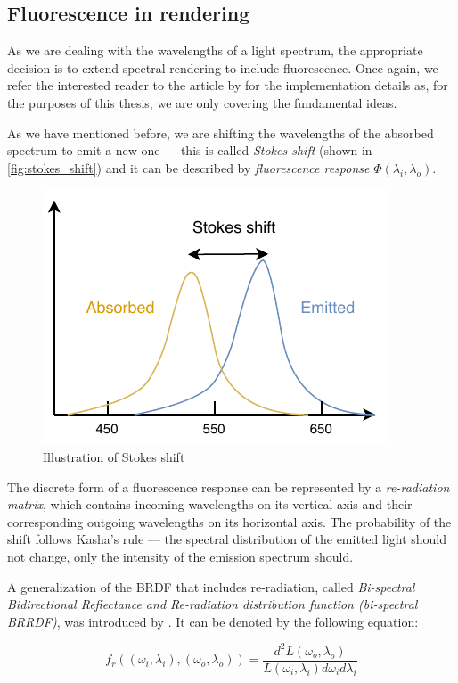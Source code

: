 \subsection{Fluorescence in rendering}
As we are dealing with the wavelengths of a light spectrum, the appropriate decision is to extend spectral rendering to include fluorescence. Once again, we refer the interested reader to the article by \citet{mojzik2018handling} for the implementation details as, for the purposes of this thesis, we are only covering the fundamental ideas.

As we have mentioned before, we are shifting the wavelengths of the absorbed spectrum to emit a new one --- this is called \emph{Stokes shift} (shown in \autoref{fig:stokes_shift}) and it can be described by \emph{fluorescence response} $\Phi(\lambda_i,\lambda_o)$.

\begin{figure}
	\centering
	\includegraphics[width=0.7\linewidth]{img/stokes_shift.pdf}
	\caption{Illustration of Stokes shift}
	\label{fig:stokes_shift}
\end{figure}

The discrete form of a fluorescence response can be represented by a \emph{re-radiation matrix}, which contains incoming wavelengths on its vertical axis and their corresponding outgoing wavelengths on its horizontal axis. The probability of the shift follows Kasha's rule --- the spectral distribution of the emitted light should not change, only the intensity of the emission spectrum should.

A generalization of the BRDF that includes re-radiation, called \emph{Bi-spectral Bidirectional Reflectance and Re-radiation distribution function (bi-spectral BRRDF)}, was introduced by \citet{hullin2010acquisition}. It can be denoted by the following equation:

\begin{equation}
f_r((\omega_i,\lambda_i),(\omega_o,\lambda_o))=\frac{d^2L(\omega_o,\lambda_o)}{L(\omega_i,\lambda_i)d\omega_i d\lambda_i}
\end{equation}

